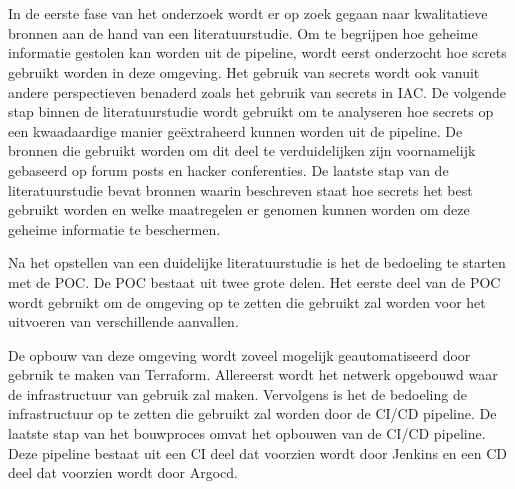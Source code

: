 
\chapter{}%
\label{ch:methodologie}


In de eerste fase van het onderzoek wordt er op zoek gegaan naar kwalitatieve bronnen aan de hand van een literatuurstudie. Om te begrijpen hoe geheime informatie gestolen kan worden uit de pipeline, wordt eerst onderzocht hoe screts gebruikt worden in deze omgeving. Het gebruik van secrets wordt ook vanuit andere perspectieven benaderd zoals het gebruik van secrets in IAC. De volgende stap binnen de literatuurstudie wordt gebruikt om te analyseren hoe secrets op een kwaadaardige manier geëxtraheerd kunnen worden uit de pipeline. De bronnen die gebruikt worden om dit deel te verduidelijken zijn voornamelijk gebaseerd op forum posts en hacker conferenties. De laatste stap van de literatuurstudie bevat bronnen waarin beschreven staat hoe secrets het best gebruikt worden en welke maatregelen er genomen kunnen worden om deze geheime informatie te beschermen.
\newline

Na het opstellen van een duidelijke literatuurstudie is het de bedoeling te starten met de POC. De POC bestaat uit twee grote delen. Het eerste deel van de POC wordt gebruikt om de omgeving op te zetten die gebruikt zal worden voor het uitvoeren van verschillende aanvallen.
\newline

De opbouw van deze omgeving wordt zoveel mogelijk geautomatiseerd door gebruik te maken van Terraform. Allereerst wordt het netwerk opgebouwd waar de infrastructuur van gebruik zal maken. Vervolgens is het de bedoeling de infrastructuur op te zetten die gebruikt zal worden door de CI/CD pipeline. De laatste stap van het bouwproces omvat het opbouwen van de CI/CD pipeline. Deze pipeline bestaat uit een CI deel dat voorzien wordt door Jenkins en een CD deel dat voorzien wordt door Argocd.
\clearpage

